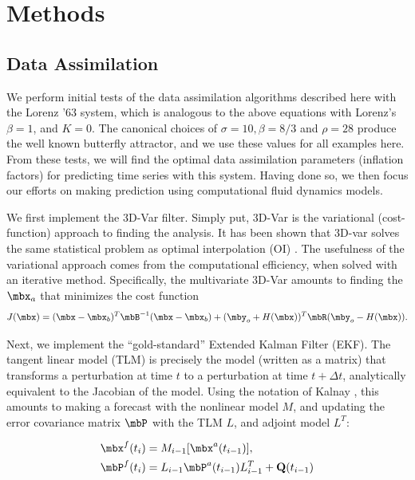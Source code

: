 \section{Methods}

\subsection{Data Assimilation}

We perform initial tests of the data assimilation algorithms described here with the Lorenz '63 system, which is analogous to the above equations with Lorenz's $\beta = 1$, and $K = 0$.
The canonical choices of $\sigma = 10, \beta = 8/3$ and $\rho = 28$ produce the well known butterfly attractor, and we use these values for all examples here.
From these tests, we will find the optimal data assimilation parameters (inflation factors) for predicting time series with this system.
Having done so, we then focus our efforts on making prediction using computational fluid dynamics models.

We first implement the 3D-Var filter.
Simply put, 3D-Var is the variational (cost-function) approach to finding the analysis.
It has been shown that 3D-var solves the same statistical problem as optimal interpolation (OI) \cite{lorenc1986analysis}.
The usefulness of the variational approach comes from the computational efficiency, when solved with an iterative method.
Specifically, the multivariate 3D-Var amounts to finding the $\mbx _a$ that minimizes the cost function
\begin{equation} J(\mbx) = (\mbx - \mbx_b) ^T \mbB ^{-1} (\mbx - \mbx_b) + (\mby_o + H(\mbx))^T\mbR (\mby_o - H(\mbx)) .\end{equation}

Next, we implement the ``gold-standard'' Extended Kalman Filter (EKF).
The tangent linear model (TLM) is precisely the model (written as a matrix) that transforms a perturbation at time $t$ to a perturbation at time $t+\Delta t$, analytically equivalent to the Jacobian of the model.
Using the notation of Kalnay \cite{kalnay2003}, this amounts to making a forecast with the nonlinear model $M$, and updating the error covariance matrix $\mbP$ with the TLM $L$, and adjoint model $L^T$:

\begin{align*} \mbx^f (t_i) &= M _{i-1} [\mbx ^a (t_{i-1} ) ],\\
\mbP^f (t_i ) &= L_{i-1} \mbP^a (t_{i-1} ) L^T _{i-1} + \mathbf{Q} (t_{i-1} ) \end{align*}

